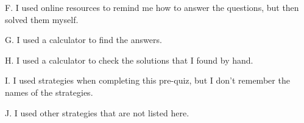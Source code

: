 \documentclass{ximera}
\begin{document}
\begin{question}
\begin{question}
    \begin{multipleChoice}
    \end{multipleChoice}
    
\end{question}
\begin{question}    
    
    F. I used online resources to remind me how to answer the questions, but then solved them myself.

    \begin{multipleChoice}
    \end{multipleChoice}
    
\end{question}

\begin{question}    
    
    G. I used a calculator to find the answers.

    \begin{multipleChoice}
    \end{multipleChoice}
    
\end{question}

\begin{question}    
    
    H. I used a calculator to check the solutions that I found by hand.

    \begin{multipleChoice}
    \end{multipleChoice}
    
\end{question}
\begin{question}    
    
    I. I used strategies when completing this pre-quiz, but I don't remember the names of the strategies.

    \begin{multipleChoice}
    \end{multipleChoice}
    
\end{question}
\begin{question}    
    
    J. I used other strategies that are not listed here.


\end{question}
\end{question}
\end{document}
